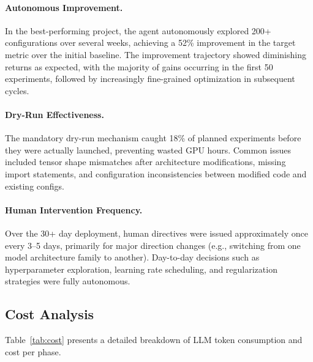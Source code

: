 \paragraph{Autonomous Improvement.} In the best-performing project, the agent autonomously explored 200+ configurations over several weeks, achieving a 52\% improvement in the target metric over the initial baseline. The improvement trajectory showed diminishing returns as expected, with the majority of gains occurring in the first 50 experiments, followed by increasingly fine-grained optimization in subsequent cycles.

\paragraph{Dry-Run Effectiveness.} The mandatory dry-run mechanism caught 18\% of planned experiments before they were actually launched, preventing wasted GPU hours. Common issues included tensor shape mismatches after architecture modifications, missing import statements, and configuration inconsistencies between modified code and existing configs.

\paragraph{Human Intervention Frequency.} Over the 30+ day deployment, human directives were issued approximately once every 3--5 days, primarily for major direction changes (e.g., switching from one model architecture family to another). Day-to-day decisions such as hyperparameter exploration, learning rate scheduling, and regularization strategies were fully autonomous.

\subsection{Cost Analysis}

Table~\ref{tab:cost} presents a detailed breakdown of LLM token consumption and cost per phase.

